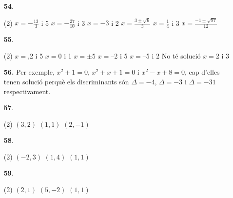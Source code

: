 \documentclass[a4paper, pdf, twoside]{book}
\begin{document}
\begin{multicols}{2}
\begin{enumerate}

 \item[\fontfamily{phv}\selectfont\color{blue}\textbf{54}. ] 
 \begin{tasks}[column-sep=1em, item-indent=1.3333em](2)
	 \task $x=-\frac {13}{3}$ i 5
	 \task $x=-\frac {27}{10}$ i 3
	 \task $x=-3$ i 2
	 \task $x=\frac {3\pm \sqrt {6}}{3}$
	 \task $x=\frac {1}{4}$ i 3
	 \task* $x=\frac {-1\pm \sqrt {97}}{12}$
\end{tasks}
\vspace{0.25cm}



 \item[\fontfamily{phv}\selectfont\color{blue}\textbf{55}. ] 
 \begin{tasks}[column-sep=1em, item-indent=1.3333em](2)
	 \task $x=$,2 i 5 $x=$0 i 1
	 \task $x=\pm 5$
	 \task $x=$--2 i 5
	 \task $x=$--5 i 2
	 \task No té solució
	 \task $x=$2 i 3
\end{tasks}
\vspace{0.25cm}
\item[\fontfamily{phv}\selectfont\color{blue}\textbf{56. }] 
Per exemple, $x^2+1=0$, $x^2+x+1=0$ i $x^2-x+8=0$, cap d'elles tenen solució perquè els discriminants són $\Delta =-4$, $\Delta =-3$ i $\Delta =-31$ respectivament.
\vspace{0.25cm}



 \item[\fontfamily{phv}\selectfont\color{blue}\textbf{57}. ] 
 \begin{tasks}[column-sep=1em, item-indent=1.3333em](2)
	 \task $(3,2)$
	 \task $(1,1)$
	 \task $(2,-1)$
\end{tasks}
\vspace{0.25cm}



 \item[\fontfamily{phv}\selectfont\color{blue}\textbf{58}. ] 
 \begin{tasks}[column-sep=1em, item-indent=1.3333em](2)
	 \task $(-2,3)$
	 \task $(1,4)$
	 \task $(1,1)$
\end{tasks}
\vspace{0.25cm}



 \item[\fontfamily{phv}\selectfont\color{blue}\textbf{59}. ] 
 \begin{tasks}[column-sep=1em, item-indent=1.3333em](2)
	 \task $(2,1)$
	 \task $(5,-2)$
	 \task $(1,1)$
\end{tasks}
\vspace{0.25cm}



\end{enumerate}
\end{multicols}
\end{document}
